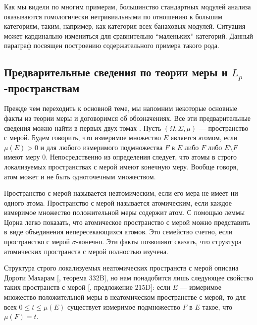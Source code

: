 Как мы видели по многим примерам, большинство стандартных модулей анализа оказываются гомологически нетривиальными по отношению к большим категориям, таким, например, как категория всех банаховых модулей. Ситуация может кардинально измениться для сравнительно ``маленьких'' категорий. Данный параграф посвящен построению содержательного примера такого рода.


\subsection{Предварительные сведения по теории меры и \texorpdfstring{$L_p$}{Lp}-пространствам}
\label{SubSectionPreliminariesOnMeasureTheoryAndLpSpaces}

Прежде чем переходить к основной теме, мы напомним некоторые основные факты из теории меры и договоримся об обозначениях. Все эти предварительные сведения можно найти в первых двух томах \cite{FremMeasTh}. Пусть $(\Omega, \Sigma, \mu)$ --- пространство с мерой. Будем говорить, что измеримое множество $E$ является атомом, если $\mu(E)>0$ и для любого измеримого подмножества $F$ в $E$ либо $F$ либо $E\setminus F$ имеют меру $0$. Непосредственно из определения следует, что атомы в строго локализуемых пространствах с мерой имеют конечную меру. Вообще говоря, атом может и не быть одноточечным множеством.

Пространство с мерой называется неатомическим, если его мера не имеет ни одного атома. Пространство с мерой называется атомическим, если каждое измеримое множество положительной меры содержит атом. С помощью леммы Цорна легко показать, что атомическое пространство с мерой можно представить в виде объединения непересекающихся атомов.  Это семейство счетно, если пространство с мерой $\sigma$-конечно. Эти факты позволяют сказать, что структура атомических пространств с мерой полностью изучена. 

Структура строго локализуемых неатомических пространств с мерой описана Дороти Махарам [\cite{FremMeasTh}, теорема 332B], но нам понадобится лишь следующее свойство таких пространств с мерой [\cite{FremMeasTh}, предложение 215D]: если $E$ --- измеримое множество положительной меры в неатомическом пространстве с мерой, то для всех $0\leq t\leq \mu(E)$ существует измеримое подмножество $F$ в $E$ такое, что $\mu(F)=t$.


